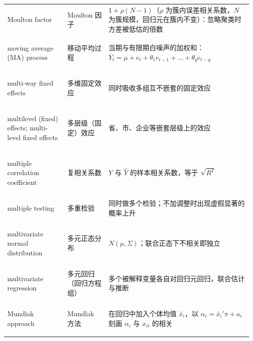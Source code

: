 \begin{longtable}{@{}>{\bfseries\boldmath\raggedright\arraybackslash}p{4.6cm}>{\raggedright\arraybackslash}p{3.2cm}>{\raggedright\arraybackslash}p{\dimexpr\textwidth-7.8cm-4\tabcolsep\relax}@{}}
Moulton factor & Moulton 因子 & $1+\rho(N-1)$（$\rho$ 为簇内误差相关系数，$N$ 为簇规模，回归元在簇内不变）：忽略聚类时方差被低估的倍数 \\
moving average (MA) process & 移动平均过程 & 当期与有限期白噪声的加权和：$Y_t=\mu+e_t+\theta_1e_{t-1}+\dots+\theta_qe_{t-q}$ \\
multi-way fixed effects & 多维固定效应 & 同时吸收多组互不嵌套的固定效应 \\
multilevel (fixed) effects; multi-level fixed effects & 多层级（固定）效应 & 省、市、企业等嵌套层级上的效应 \\
multiple correlation coefficient & 复相关系数 & $Y$ 与 $\hat Y$ 的样本相关系数，等于 $\sqrt{R^2}$ \\
multiple testing & 多重检验 & 同时做多个检验；不加调整时出现虚假显著的概率上升 \\
multivariate normal distribution & 多元正态分布 & $N(\mu,\Sigma)$；联合正态下不相关即独立 \\
multivariate regression & 多元回归（回归方程组） & 多个被解释变量各自对回归元回归，联合估计与推断 \\
Mundlak approach & Mundlak 方法 & 在回归中加入个体均值 $\bar x_i$，以 $\alpha_i=\bar x_i'\pi+a_i$ 刻画 $\alpha_i$ 与 $x_{it}$ 的相关 \\
\end{longtable}

\par{}\ifdim\dimexpr\pagegoal-\pagetotal\relax<16\baselineskip\newpage\fi
